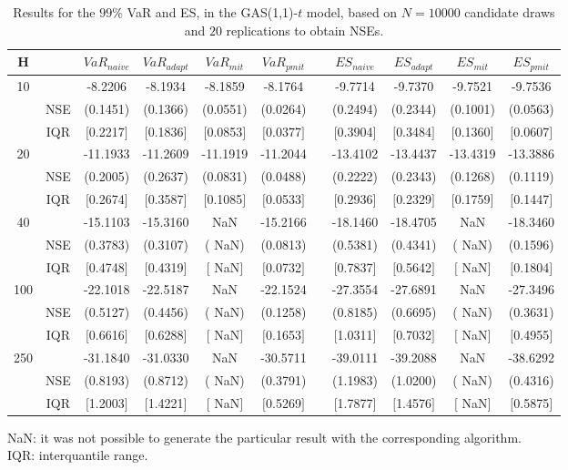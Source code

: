 \begin{table}[h] 
\centering 
\caption{Results for the $99\%$ VaR and ES, in the GAS(1,1)-$t$ model, based on $N=10000$ candidate draws and $20$ replications to obtain NSEs.} 
\label{tab:res_algos_t_gas} 
\begin{tabular}{ccccccccccc}  
 H & & $VaR_{naive}$ & $VaR_{adapt}$ & $VaR_{mit}$  & $VaR_{pmit}$ &  & $ES_{naive}$ & $ES_{adapt}$ & $ES_{mit}$ & $ES_{pmit}$ \\ \hline 
10 & & -8.2206 & -8.1934 & -8.1859 & -8.1764 & & -9.7714 & -9.7370 & -9.7521 & -9.7536  \\ 
  & NSE & (0.1451) & (0.1366) & (0.0551) & (0.0264) & & (0.2494) & (0.2344) & (0.1001) & (0.0563)   \\ 
 & IQR & $[$0.2217$]$ & $[$0.1836$]$ & $[$0.0853$]$ & $[$0.0377$]$ & & $[$0.3904$]$ & $[$0.3484$]$ & $[$0.1360$]$ & $[$0.0607$]$  \\ [1ex] 
20 & & -11.1933 & -11.2609 & -11.1919 & -11.2044 & & -13.4102 & -13.4437 & -13.4319 & -13.3886  \\ 
  & NSE & (0.2005) & (0.2637) & (0.0831) & (0.0488) & & (0.2222) & (0.2343) & (0.1268) & (0.1119)   \\ 
 & IQR & $[$0.2674$]$ & $[$0.3587$]$ & $[$0.1085$]$ & $[$0.0533$]$ & & $[$0.2936$]$ & $[$0.2329$]$ & $[$0.1759$]$ & $[$0.1447$]$  \\ [1ex] 
40 & & -15.1103 & -15.3160 &    NaN & -15.2166 & & -18.1460 & -18.4705 &    NaN & -18.3460  \\ 
  & NSE & (0.3783) & (0.3107) & (   NaN) & (0.0813) & & (0.5381) & (0.4341) & (   NaN) & (0.1596)   \\ 
 & IQR & $[$0.4748$]$ & $[$0.4319$]$ & $[$   NaN$]$ & $[$0.0732$]$ & & $[$0.7837$]$ & $[$0.5642$]$ & $[$   NaN$]$ & $[$0.1804$]$  \\ [1ex] 
100 & & -22.1018 & -22.5187 &    NaN & -22.1524 & & -27.3554 & -27.6891 &    NaN & -27.3496  \\ 
  & NSE & (0.5127) & (0.4456) & (   NaN) & (0.1258) & & (0.8185) & (0.6695) & (   NaN) & (0.3631)   \\ 
 & IQR & $[$0.6616$]$ & $[$0.6288$]$ & $[$   NaN$]$ & $[$0.1653$]$ & & $[$1.0311$]$ & $[$0.7032$]$ & $[$   NaN$]$ & $[$0.4955$]$  \\ [1ex] 
250 & & -31.1840 & -31.0330 &    NaN & -30.5711 & & -39.0111 & -39.2088 &    NaN & -38.6292  \\ 
  & NSE & (0.8193) & (0.8712) & (   NaN) & (0.3791) & & (1.1983) & (1.0200) & (   NaN) & (0.4316)   \\ 
 & IQR & $[$1.2003$]$ & $[$1.4221$]$ & $[$   NaN$]$ & $[$0.5269$]$ & & $[$1.7877$]$ & $[$1.4576$]$ & $[$   NaN$]$ & $[$0.5875$]$  \\ [1ex] 
\hline 
\end{tabular} 
\raggedright 

\vspace{5pt}\footnotesize{NaN: it was not possible to generate the particular result with the corresponding algorithm.} \\ 
\vspace{5pt}\footnotesize{IQR: interquantile range.} 
\end{table} 
